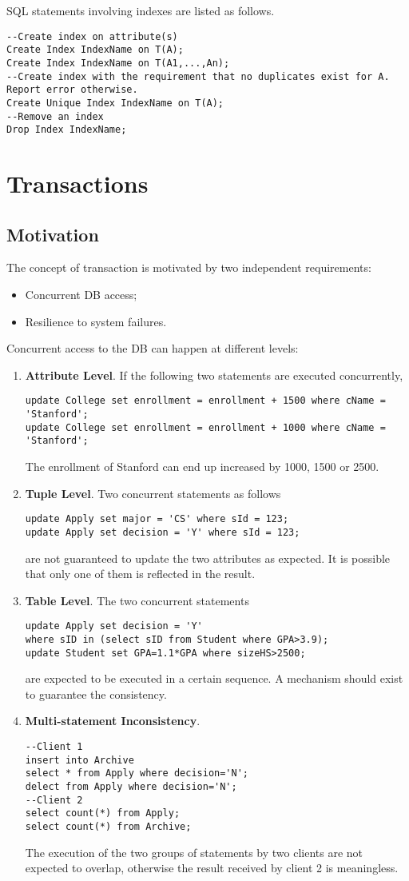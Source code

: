 SQL statements involving indexes are listed as follows.
\begin{lstlisting}
--Create index on attribute(s)
Create Index IndexName on T(A);
Create Index IndexName on T(A1,...,An);
--Create index with the requirement that no duplicates exist for A. Report error otherwise.
Create Unique Index IndexName on T(A);
--Remove an index
Drop Index IndexName;
\end{lstlisting}
\section{Transactions}
\subsection{Motivation}
The concept of transaction is motivated by two independent requirements:
\begin{itemize}
\item Concurrent DB access;
\item Resilience to system failures.
\end{itemize}
Concurrent access to the DB can happen at different levels:
\begin{enumerate}
\item\textbf{Attribute Level}. If the following two statements are executed concurrently,
\begin{lstlisting}
update College set enrollment = enrollment + 1500 where cName = 'Stanford';
update College set enrollment = enrollment + 1000 where cName = 'Stanford';
\end{lstlisting}
The enrollment of Stanford can end up increased by 1000, 1500 or 2500.
\item\textbf{Tuple Level}. Two concurrent statements as follows
\begin{lstlisting}
update Apply set major = 'CS' where sId = 123;
update Apply set decision = 'Y' where sId = 123;
\end{lstlisting}
are not guaranteed to update the two attributes as expected. It is possible that only one of them is reflected in the result.
\item\textbf{Table Level}. The two concurrent statements 
\begin{lstlisting}
update Apply set decision = 'Y' 
where sID in (select sID from Student where GPA>3.9);
update Student set GPA=1.1*GPA where sizeHS>2500;
\end{lstlisting}
are expected to be executed in a certain sequence. A mechanism should exist to guarantee the consistency.
\item\textbf{Multi-statement Inconsistency}.
\begin{lstlisting}
--Client 1
insert into Archive
select * from Apply where decision='N';
delect from Apply where decision='N';
--Client 2
select count(*) from Apply;
select count(*) from Archive;
\end{lstlisting}
The execution of the two groups of statements by two clients are not expected to overlap, otherwise the result received by client 2 is meaningless.
\end{enumerate}

